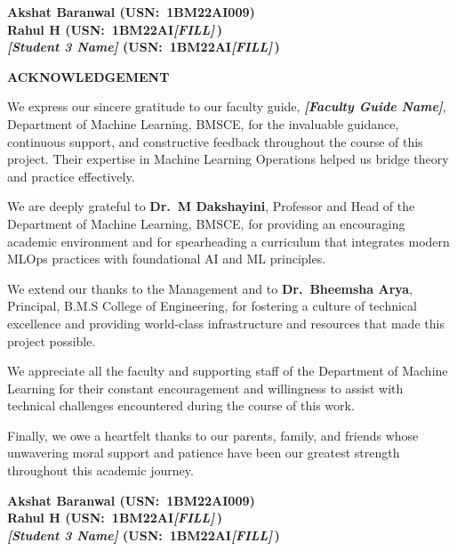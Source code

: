 \documentclass[12pt,a4paper]{report}
\newcommand{\hodname}{Dr.~M Dakshayini}
\newcommand{\principalname}{Dr.~Bheemsha Arya}
\newcommand{\studentA}{Akshat Baranwal \quad (USN:~1BM22AI009)}
\newcommand{\studentB}{Rahul H          \quad (USN:~1BM22AI\textit{[FILL]}\,)}
\newcommand{\studentC}{\textit{[Student 3 Name]}  \quad (USN:~1BM22AI\textit{[FILL]}\,)}
\newcommand{\facultyname}{\textit{[Faculty Guide Name]}}
\begin{document}
\vspace{2.5cm}

\begin{flushright}
\textbf{\fontsize{14}{18}\selectfont \studentA}\\[6pt]
\textbf{\fontsize{14}{18}\selectfont \studentB}\\[6pt]
\textbf{\fontsize{14}{18}\selectfont \studentC}\\
\end{flushright}

\newpage
\thispagestyle{plain}
\begin{center}
  \textbf{\fontsize{14}{18}\selectfont ACKNOWLEDGEMENT}
\end{center}

\vspace{0.4cm}

We express our sincere gratitude to our faculty guide, \textbf{\facultyname},
Department of Machine Learning, BMSCE, for the invaluable guidance,
continuous support, and constructive feedback throughout the course of
this project.  Their expertise in Machine Learning Operations helped us
bridge theory and practice effectively.

We are deeply grateful to \textbf{\hodname}, Professor and Head of the
Department of Machine Learning, BMSCE, for providing an encouraging
academic environment and for spearheading a curriculum that integrates
modern MLOps practices with foundational AI and ML principles.

We extend our thanks to the Management and to \textbf{\principalname},
Principal, B.M.S College of Engineering, for fostering a culture of
technical excellence and providing world-class infrastructure and
resources that made this project possible.

We appreciate all the faculty and supporting staff of the Department of
Machine Learning for their constant encouragement and willingness to
assist with technical challenges encountered during the course of this
work.

Finally, we owe a heartfelt thanks to our parents, family, and friends
whose unwavering moral support and patience have been our greatest
strength throughout this academic journey.

\vspace{2.0cm}

\begin{flushright}
\textbf{\fontsize{14}{18}\selectfont \studentA}\\[6pt]
\textbf{\fontsize{14}{18}\selectfont \studentB}\\[6pt]
\textbf{\fontsize{14}{18}\selectfont \studentC}\\
\end{flushright}
\end{document}

